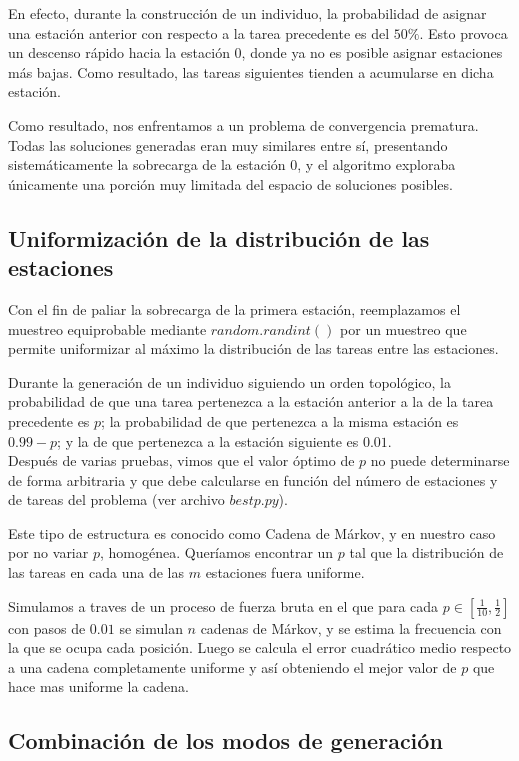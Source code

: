 \documentclass[12pt,a4paper]{report}
\begin{document}
    En efecto, durante la construcción de un individuo, la probabilidad de asignar una estación anterior con respecto a la tarea precedente es del $50\%$. Esto provoca un descenso rápido hacia la estación $0$, donde ya no es posible asignar estaciones más bajas. Como resultado, las tareas siguientes tienden a acumularse en dicha estación.

    Como resultado, nos enfrentamos a un problema de convergencia prematura. Todas las soluciones generadas eran muy similares entre sí, presentando sistemáticamente la sobrecarga de la estación $0$, y el algoritmo exploraba únicamente una porción muy limitada del espacio de soluciones posibles.


    \subsection*{Uniformización de la distribución de las estaciones}

    Con el fin de paliar la sobrecarga de la primera estación, reemplazamos el muestreo equiprobable mediante $random.randint()$ por un muestreo que permite uniformizar al máximo la distribución de las tareas entre las estaciones.

    Durante la generación de un individuo siguiendo un orden topológico, la probabilidad de que una tarea pertenezca a la estación anterior a la de la tarea precedente es $p$; la probabilidad de que pertenezca a la misma estación es $0.99 - p$; y la de que pertenezca a la estación siguiente es $0.01$.\\ 
    
    Después de varias pruebas, vimos que el valor óptimo de $p$ no puede determinarse de forma arbitraria y que debe calcularse en función del número de estaciones y de tareas del problema (ver archivo $bestp.py$).

    Este tipo de estructura es conocido como Cadena de Márkov, y en nuestro caso por no variar $p$, homogénea. Queríamos encontrar un $p$ tal que la distribución de las tareas en cada una de las $m$ estaciones fuera uniforme.

    Simulamos a traves de un proceso de fuerza bruta en el que para cada $p\in[\frac1 {10},\frac 1 2]$ con pasos de $0.01$ se simulan $n$ cadenas de Márkov, y se estima la frecuencia con la que se ocupa cada posición. Luego se calcula el error cuadrático medio respecto a una cadena completamente uniforme y así obteniendo el mejor valor de $p$ que hace mas uniforme la cadena.

    \subsection*{Combinación de los modos de generación}
\end{document}
